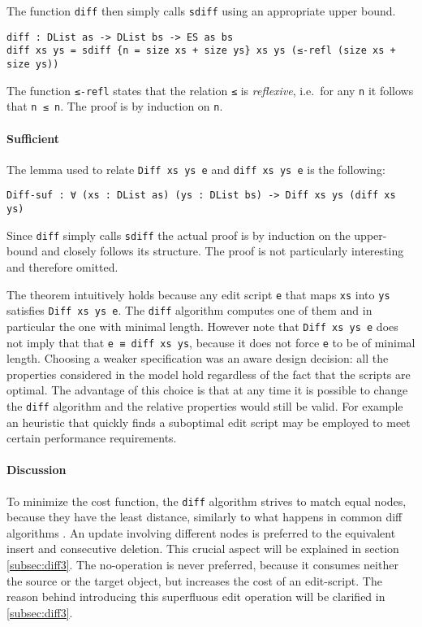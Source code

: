 \documentclass[../Thesis.tex]{subfiles}
\begin{document}
	The function \texttt{diff} then simply calls \texttt{sdiff} using an appropriate
	upper bound.
		
\begin{verbatim}
diff : DList as -> DList bs -> ES as bs
diff xs ys = sdiff {n = size xs + size ys} xs ys (≤-refl (size xs + size ys))
\end{verbatim}

	The function \texttt{≤-refl} states that the relation \texttt{≤} is 
	\emph{reflexive}, i.e.\ for any \texttt{n} it follows that \texttt{n ≤ n}.
	The proof is by induction on \texttt{n}.	 

	\paragraph{Sufficient}
	The lemma used to relate \texttt{Diff xs ys e} and \texttt{diff xs ys e} 
	is the following:
\begin{verbatim}	
Diff-suf : ∀ (xs : DList as) (ys : DList bs) -> Diff xs ys (diff xs ys)
\end{verbatim}

	Since \texttt{diff} simply calls \texttt{sdiff} 	 the actual proof is 
	by induction on the upper-bound and closely follows its
	structure. The proof is not particularly interesting and therefore omitted.

	The theorem intuitively holds because any edit script \texttt{e} that maps 
	\texttt{xs} into \texttt{ys} satisfies \texttt{Diff xs ys e}.
	The \texttt{diff} algorithm computes one of them and in particular the one
	with minimal length. 
	However note that \texttt{Diff xs ys e} does not imply that
	that \texttt{e ≡ diff xs ys}, because it does not force \texttt{e} to be 
	of minimal length.
	Choosing a weaker specification was an aware design decision:
	all the properties considered in the model hold regardless of 
	the fact that the scripts are optimal. The advantage
	of this choice is that at any time it is possible to change the \texttt{diff}
	algorithm and the relative properties would still be valid.
	For example an heuristic that quickly finds a suboptimal edit script 
	may be employed to meet certain performance requirements.
	
	\paragraph{Discussion}
	To minimize the cost function, the \texttt{diff} algorithm strives to 
	match equal nodes, because they have the least distance, similarly to 
	what happens in common diff algorithms \cite{Lemp09}.
	An update involving different nodes is preferred to the equivalent 
	insert and consecutive deletion. This crucial aspect will be explained
	in section \ref{subsec:diff3}.
	The no-operation is never preferred, because it consumes neither the
	source or the target object, but increases the cost of an edit-script.
	The reason behind introducing this superfluous edit operation	will be 
	clarified in \ref{subsec:diff3}.
\end{document}
